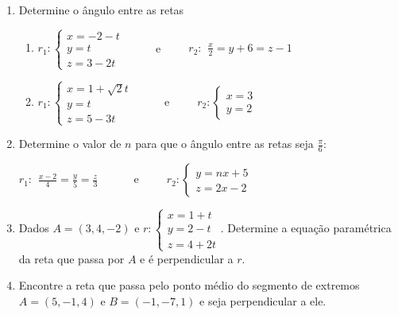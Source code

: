 \documentclass[a4paper,5pt]{amsbook}
\newcommand{\ds}{\displaystyle}
\begin{document}
\begin{enumerate}
	\vspace{0.3cm}
	\item Determine o \^angulo entre as retas
	\begin{enumerate}
		\item
			$r_1:\left\{\begin{array}{l}
				x = -2 -t \\
				y = t \\
				z = 3 - 2t
			\end{array}\right.$
		\ \ \ \ \ e\ \ \ \ \ 
			$r_2:\begin{array}{l}
				\ds\frac{x}{2} = y+6 = z-1
			\end{array}$
		\item
			$r_1:\left\{\begin{array}{l}
				x = 1 + \sqrt{2}t \\
				y = t \\
				z = 5 - 3t
			\end{array}\right.$
		\ \ \ \ \ e\ \ \ \ \ 
			$r_2:\left\{\begin{array}{l}
				x = 3 \\
				y = 2
			\end{array}\right.$
	\end{enumerate}
	
	\vspace{0.3cm}
	\item Determine o valor de $n$ para que o \^angulo entre as retas seja
		$\frac{\pi}{6}$:

	$r_1:\begin{array}{l}
		\ds\frac{x-2}{4} = \frac{y}{5} = \frac{z}{3}
	\end{array}$
	\ \ \ \ \ e\ \ \ \ \ 
	$r_2:\left\{\begin{array}{l}
		y = nx + 5 \\
		z = 2x - 2
	\end{array}\right.$
	
	\vspace{0.3cm}
	\item Dados $A = (3, 4, -2)$ e 
	$r:\left\{\begin{array}{l}
		x = 1 + t \\
		y = 2 - t \\
		z = 4 + 2t
	\end{array}\right.$. Determine a equa\c{c}\~ao param\'etrica da reta que passa por
$A$ e \'e perpendicular a $r$.
	
	\vspace{0.3cm}
	\item Encontre a reta que passa pelo ponto m\'edio do segmento de extremos $A
		= (5, -1, 4)$ e $B = (-1, -7, 1)$ e seja perpendicular a ele.
\end{enumerate}
\end{document}

